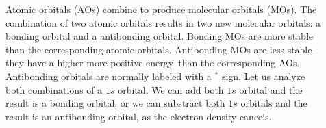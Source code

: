 \documentclass[main.tex]{subfiles}
\newcommand\chapterlabel{geometry}
\begin{document}
	
    \sloppy 
\begin{description}


\item[] Atomic orbitals (AOs) combine to produce molecular orbitals (MOs). The combination of two atomic orbitals results in two new molecular orbitals: a bonding orbital and a antibonding orbital. Bonding MOs are more stable than the corresponding atomic orbitals. Antibonding MOs are less stable--they have a higher more positive energy--than the corresponding AOs. Antibonding orbitals are normally labeled with a $^*$ sign. Let us analyze both combinations of a $1s$ orbital. We can add both $1s$ orbital and the result is a bonding orbital, or we can substract both $1s$ orbitals and the result is an antibonding orbital, as the electron density cancels.



     \label{Fig:{\chapterlabel}\thefigurenewcounter}
     \begin{center}


\end{center}
\end{description}
\end{document}

